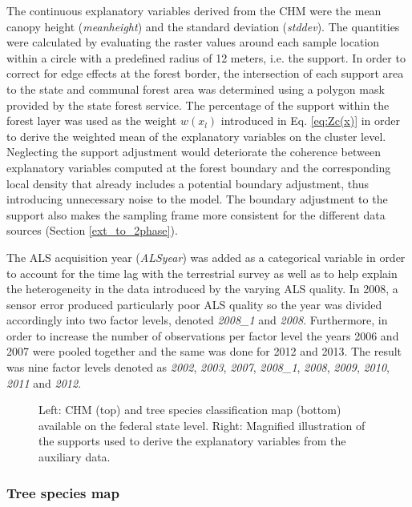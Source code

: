 The continuous explanatory variables derived from the CHM were the mean canopy height (\textit{meanheight}) and the standard deviation (\textit{stddev}). The quantities were calculated by evaluating the raster values around each sample location within a circle with a predefined radius of 12 meters, i.e. the support. In order to correct for edge effects at the forest border, the intersection of each support area to the state and communal forest area was determined using a polygon mask provided by the state forest service. The percentage of the support within the forest layer was used as the weight $w(x_l)$ introduced in Eq. \ref{eq:Zc(x)} in order to derive the weighted mean of the explanatory variables on the cluster level. Neglecting the support adjustment would deteriorate the coherence between explanatory variables computed at the forest boundary and the corresponding local density that already includes a potential boundary adjustment, thus introducing unnecessary noise to the model. The boundary adjustment to the support also makes the sampling frame more consistent for the different data sources (Section \ref{ext_to_2phase}).\par
The ALS acquisition year (\textit{ALSyear}) was added as a categorical variable in order to account for the time lag with the terrestrial survey as well as to help explain the heterogeneity in the data introduced by the varying ALS quality. In 2008, a sensor error produced particularly poor ALS quality so the year was divided accordingly into two factor levels, denoted \textit{2008\_1} and \textit{2008}. Furthermore, in order to increase the number of observations per factor level the years 2006 and 2007 were pooled together and the same was done for 2012 and 2013.  The result was nine factor levels denoted as \textit{2002}, \textit{2003}, \textit{2007}, \textit{2008\_1}, \textit{2008}, \textit{2009}, \textit{2010}, \textit{2011} and \textit{2012}.

\begin{figure}[H]
	\centering
	\caption{Left: CHM (top) and tree species classification map (bottom) available on the federal state level. Right: Magnified illustration of the supports used to derive the explanatory variables from the auxiliary data.}
	\label{fig:Auxvars}
\end{figure}


\subsubsection{Tree species map}

